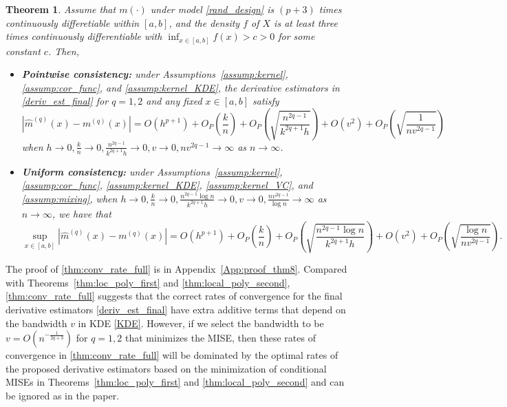 \documentclass{uwstat572}
\newtheorem{theorem}{Theorem}
\theoremstyle{definition}
\renewcommand{\hat}{\widehat}
\theoremstyle{theorem}
\begin{document}
\begin{theorem}
\label{thm:conv_rate_full}
Assume that $m(\cdot)$ under model \eqref{rand_design} is $(p+3)$ times continuously differetiable within $[a,b]$, and the density $f$ of $X$ is at least three times continuously differentiable with $\inf_{x\in [a,b]} f(x) > c >0$ for some constant $c$. Then,
\begin{itemize}
	\item {\bf Pointwise consistency:} under Assumptions~\ref{assump:kernel}, \ref{assump:cor_func}, and \ref{assump:kernel_KDE}, the derivative estimators in \eqref{deriv_est_final} for $q=1,2$ and any fixed $x\in [a,b]$ satisfy
	$$\left|\hat{m}^{(q)}(x) - m^{(q)}(x)\right| = O\left(h^{p+1}\right) +O_P\left(\frac{k}{n}\right) + O_P\left(\sqrt{\frac{n^{2q-1}}{k^{2q+1}h}}\right) + O(v^2) + O_P\left(\sqrt{\frac{1}{nv^{2q-1}}}\right)$$
	when $h\to 0, \frac{k}{n} \to 0, \frac{n^{2q-1}}{k^{2q+1}h} \to 0, v\to 0, nv^{2q-1} \to \infty$ as $n\to \infty$.
	
	\item {\bf Uniform consistency:} under Assumptions~\ref{assump:kernel}, \ref{assump:cor_func}, \ref{assump:kernel_KDE}, \ref{assump:kernel_VC}, and \ref{assump:mixing}, when $h\to 0, \frac{k}{n} \to 0, \frac{n^{2q-1}\log n}{k^{2q+1}h} \to 0, v\to 0, \frac{nv^{2q-1}}{\log n} \to \infty$ as $n\to \infty$, we have that
	$$\sup_{x\in [a,b]}\left|\hat{m}^{(q)}(x) - m^{(q)}(x) \right| = O\left(h^{p+1}\right) +O_P\left(\frac{k}{n}\right) + O_P\left(\sqrt{\frac{n^{2q-1}\log n}{k^{2q+1}h}}\right) + O(v^2) + O_P\left(\sqrt{\frac{\log n}{nv^{2q-1}}}\right).$$
\end{itemize}
\end{theorem}

\noindent The proof of \autoref{thm:conv_rate_full} is in Appendix~\ref{App:proof_thm8}. Compared with Theorems~\ref{thm:loc_poly_first} and \ref{thm:local_poly_second}, \autoref{thm:conv_rate_full} suggests that the correct rates of convergence for the final derivative estimators \eqref{deriv_est_final} have extra additive terms that depend on the bandwidth $v$ in KDE \eqref{KDE}. However, if we select the bandwidth to be $v=O\left(n^{-\frac{1}{2q+3}}\right)$ for $q=1,2$ that minimizes the MISE, then these rates of convergence in \autoref{thm:conv_rate_full} will be dominated by the optimal rates of the proposed derivative estimators based on the minimization of conditional MISEs in Theorems~\ref{thm:loc_poly_first} and \ref{thm:local_poly_second} and can be ignored as in the paper.
\end{document}
